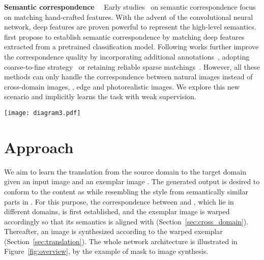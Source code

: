 \documentclass[10pt,twocolumn,letterpaper]{article}
\begin{document}
\noindent\textbf{Semantic correspondence}~~
Early studies~\cite{lowe2004distinctive,dalal2005histograms,tola2009daisy} on semantic correspondence focus on matching hand-crafted features. With the advent of the convolutional neural network, deep features are proven powerful to represent the high-level semantics. \citet{long2014convnets} first propose to establish semantic correspondence by matching deep features extracted from a pretrained classification model. Following works further improve the correspondence quality by incorporating additional annotations~\cite{zhou2016learning,choy2016universal,ham2017proposal,han2017scnet,kim2017fcss,lee2019sfnet}, adopting coarse-to-fine strategy~\cite{liao2017visual} or retaining reliable sparse matchings~\cite{aberman2018neural}.
However, all these methods can only handle the correspondence between natural images instead of cross-domain images, \eg, edge and photorealistic images. We explore this new scenario and implicitly learns the task with weak supervision.


\begin{figure*}[t!]
	\centering
	\texttt{[image: diagram3.pdf]}
	\caption{\textbf{The illustration of the \emph{CoCosNet} architecture.} Given the input  and the exemplar , the correspondence submodule adapts them into the same domain , where dense correspondence can be established. Then, the translation network generates the final output based on the warped exemplar  according to the correspondence, yielding an exemplar-based translation output.}
	\label{fig:overview}
\end{figure*} \section{Approach}
\label{sec:method}

We aim to learn the translation from the source domain  to the target domain  given an input image  and an exemplar image . The generated output is desired to conform to the content as  while resembling the style from semantically similar parts in . For this purpose, the correspondence between  and , which lie in different domains, is first established, and the exemplar image is warped accordingly so that its semantics is aligned with  (Section~\ref{sec:cross_domain}). Thereafter, an image is synthesized according to the warped exemplar (Section~\ref{sec:translation}). The whole network architecture is illustrated in Figure~\ref{fig:overview}, by the example of mask to image synthesis.
\end{document}
